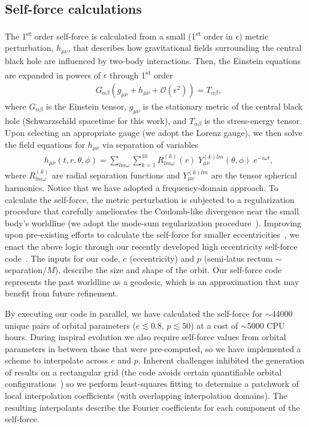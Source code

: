 \documentclass[aps,prd,twocolumn,showpacs,notitlepage,eqsecnum,
superscriptaddress,nofootinbib]{revtex4-1}
\begin{document}
\subsection{Self-force calculations}

The 1\textsuperscript{st} order self-force is calculated from a small (1\textsuperscript{st} order in $\epsilon$) metric perturbation, $h_{\mu\nu}$, that describes how gravitational fields surrounding the central black hole are influenced by two-body interactions. Then, the Einstein equations are expanded in powers of $\epsilon$ through 1\textsuperscript{st} order
\begin{align}
&G_{\alpha\beta}(g_{\mu\nu}+h_{\mu\nu} + \mathcal{O}(\epsilon^2) )= T_{\alpha\beta},
\end{align}
where $G_{\alpha\beta}$ is the Einstein tensor, $g_{\mu\nu}$ is the stationary metric of the central black hole (Schwarzschild spacetime for this work), and $T_{\alpha\beta}$ is the stress-energy tensor. Upon selecting an appropriate gauge (we adopt the Lorenz gauge), we then solve the field equations for $h_{\mu\nu}$ via separation of variables
\begin{align}
\label{eq:sep}
&h_{\mu\nu}(t, r, \theta, \phi) = \sum_{lm\omega} \sum_{k=1}^{10} R^{(k)}_{lm\omega}(r) \; Y^{(k)lm}_{\mu\nu}(\theta,\phi) \; e^{-i\omega t} ,
\end{align}
where $R^{(k)}_{lm\omega}$ are radial separation functions and $Y^{(k)lm}_{\mu\nu}$ are the tensor spherical harmonics. Notice that we have adopted a frequency-domain approach. To calculate the self-force, the metric perturbation is subjected to a regularization procedure that carefully ameliorates the Coulomb-like divergence near the small body's worldline (we adopt the mode-sum regularization procedure~\cite{BaraOri00,Bara01,BaraOri03}). Improving upon pre-existing efforts to calculate the self-force for smaller eccentricities~\cite{BaraSago10,AkcaWarb13}, we enact the above logic through our recently developed high eccentricity self-force code~\cite{OsbuFors14,HoppFors15}. The inputs for our code, $e$ (eccentricity) and $p$ (semi-latus rectum $\sim$ separation/$M$), describe the size and shape of the orbit. Our self-force code represents the past worldline as a geodesic, which is an approximation that may benefit from future refinement. 

By executing our code in parallel, we have calculated the self-force for $\sim$44000 unique pairs of orbital parameters ($e\lesssim 0.8$, $p\lesssim 50$) at a cost of $\sim$5000 CPU hours. During inspiral evolution we also require self-force values from orbital parameters in between those that were pre-computed, so we have implemented a scheme to interpolate across $e$ and $p$. Inherent challenges inhibited the generation of results on a rectangular grid (the code avoids certain quantifiable orbital configurations~\cite{OsbuFors14}) so we perform least-squares fitting to determine a patchwork of local interpolation coefficients (with overlapping interpolation domains). The resulting interpolants describe the Fourier coefficients for each component of the self-force. 
\end{document}
